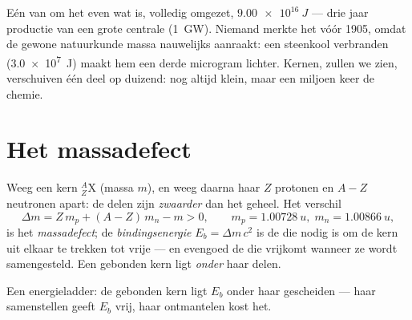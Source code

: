 \begin{example}\label{ex:g12:nuclear-energy:fortune}
Eén  van om het even wat is, volledig omgezet, $\qty{9.00e16}{J}$ ---
drie jaar productie van een grote centrale (\qty{1}{GW}). Niemand merkte het
vóór 1905, omdat de gewone natuurkunde massa nauwelijks aanraakt: een 
steenkool verbranden (\qty{3.0e7}{J}) maakt hem een derde microgram lichter.
Kernen, zullen we zien, verschuiven één deel op duizend: nog altijd klein, maar
een miljoen keer de chemie.
\end{example}

\section{Het massadefect}

\begin{definition}\label{def:g12:nuclear-energy:defect}
Weeg een kern ${}^{A}_{Z}\mathrm{X}$ (massa $m$), en weeg daarna haar $Z$
protonen en $A - Z$ neutronen apart: de delen zijn \emph{zwaarder} dan het
geheel. Het verschil
\[
\Delta m = Z\,m_p + (A - Z)\,m_n - m > 0,
\qquad m_p = \qty{1.00728}{u},\; m_n = \qty{1.00866}{u},
\]
is het \emph{massadefect}; de
\emph{bindingsenergie} $E_b = \Delta m\,c^2$ is de
 die nodig is om de kern uit elkaar te trekken tot vrije  ---
en evengoed de  die vrijkomt wanneer ze wordt samengesteld. Een gebonden
kern ligt \emph{onder} haar delen.
\end{definition}

\begin{omfigure}

{\small Een energieladder: de gebonden kern ligt $E_b$ onder haar gescheiden
 --- haar samenstellen geeft $E_b$ vrij, haar ontmantelen kost het.}
\end{omfigure}

